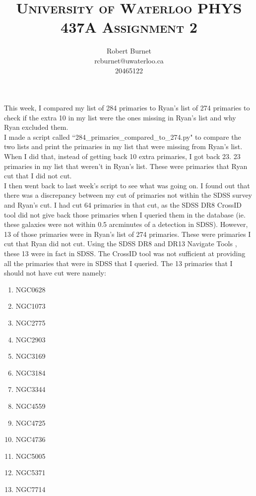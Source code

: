 \documentclass[10pt,letterpaper]{article}
\begin{document}
\title{\scshape\LARGE University of Waterloo \vfill \huge\bfseries PHYS 437A Assignment 2 \vfill}
\author{Robert Burnet \\ rcburnet@uwaterloo.ca \\ 20465122 }
\maketitle

\newpage

This week, I compared my list of 284 primaries to Ryan's list of 274 primaries to check if the extra 10 in my list were the ones missing in Ryan's list and why Ryan excluded them.\\

I made a script called ``284\_primaries\_compared\_to\_274.py" to compare the two lists and print the primaries in my list that were missing from Ryan's list. When I did that, instead of getting back 10 extra primaries, I got back 23. 23 primaries in my list that weren't in Ryan's list. These were primaries that Ryan cut that I did not cut.\\

I then went back to last week's script to see what was going on. I found out that there was a discrepancy between my cut of primaries not within the SDSS survey and Ryan's cut. I had cut 64 primaries in that cut, as the SDSS DR8 CrossID tool did not give back those primaries when I queried them in the database (ie. these galaxies were not within 0.5 arcminutes of a detection in SDSS). However, 13 of those primaries were in Ryan's list of 274 primaries. These were primaries I cut that Ryan did not cut. Using the SDSS DR8 and DR13 Navigate Tools \cite{navigate} \cite{navigate DR13}, these 13 were in fact in SDSS. The CrossID tool was not sufficient at providing all the primaries that were in SDSS that I queried. The 13 primaries that I should not have cut were namely:\\

\begin{enumerate}
\item NGC0628
\item NGC1073
\item NGC2775
\item NGC2903
\item NGC3169
\item NGC3184
\item NGC3344
\item NGC4559
\item NGC4725
\item NGC4736
\item NGC5005
\item NGC5371
\item NGC7714
\end{enumerate}
\end{document}
